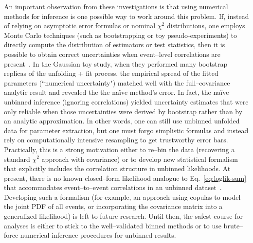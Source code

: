     An important observation from these investigations is that using numerical methods for inference is one possible way to work around this problem.
    If, instead of relying on asymptotic error formulas or nominal $\chi^2$ distributions, one employs Monte Carlo techniques (such as bootstrapping or toy pseudo-experiments) to directly compute the distribution of estimators or test statistics, then it is possible to obtain correct uncertainties when event--level correlations are present~.
    In the Gaussian toy study, when they performed many bootstrap replicas of the unfolding + fit process, the empirical spread of the fitted parameters (``numerical uncertainty") matched well with the full--covariance analytic result and revealed the the naïve method’s error.
    In fact, the naïve unbinned inference (ignoring correlations) yielded uncertainty estimates that were only reliable when those uncertainties were derived by bootstrap rather than by an analytic approximation.
    In other words, one can still use unbinned unfolded data for parameter extraction, but one must forgo simplistic formulas and instead rely on computationally intensive resampling to get trustworthy error bars.
    Practically, this is a strong motivation either to re--bin the data (recovering a standard $\chi^2$ approach with covariance) or to develop new statistical formalism that explicitly includes the correlation structure in unbinned likelihoods.
    At present, there is no known closed--form likelihood analogue to Eq.~\ref{eq:loglik-sum} that accommodates event--to--event correlations in an unbinned dataset~.
    Developing such a formalism (for example, an approach using copulas to model the joint PDF of all events, or incorporating the covariance matrix into a generalized likelihood) is left to future research.
    Until then, the safest course for analyses is either to stick to the well--validated binned methods or to use brute--force numerical inference procedures for unbinned results.

